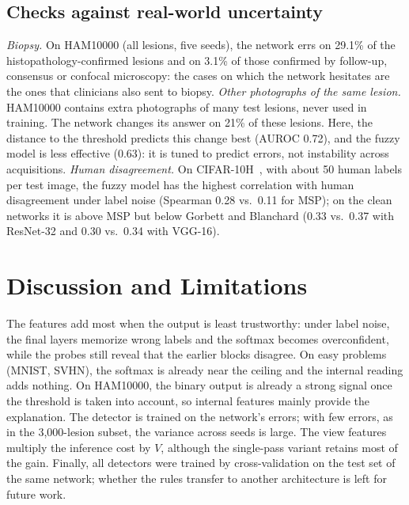 \subsection{Checks against real-world uncertainty}
\textit{Biopsy.} On HAM10000 (all lesions, five seeds), the network errs on 29.1\% of the histopathology-confirmed lesions and on 3.1\%
of those confirmed by follow-up, consensus or confocal microscopy: the cases on which the network hesitates are the ones that clinicians
also sent to biopsy.
\textit{Other photographs of the same lesion.} HAM10000 contains extra photographs of many test lesions, never used in training. The network
changes its answer on 21\% of these lesions. Here, the distance to the threshold predicts this change best (AUROC 0.72), and the fuzzy model
is less effective (0.63): it is tuned to predict errors, not instability across acquisitions.
\textit{Human disagreement.} On CIFAR-10H~\cite{peterson2019}, with about 50 human labels per test image, the fuzzy model has the highest
correlation with human disagreement under label noise (Spearman 0.28 vs.\ 0.11 for MSP); on the clean networks it is above MSP but below
Gorbett and Blanchard (0.33 vs.\ 0.37 with ResNet-32 and 0.30 vs.\ 0.34 with VGG-16).

\section{Discussion and Limitations}
The features add most when the output is least trustworthy: under label noise, the final layers memorize wrong labels and the softmax
becomes overconfident, while the probes still reveal that the earlier blocks disagree. On easy problems (MNIST, SVHN), the softmax is
already near the ceiling and the internal reading adds nothing. On HAM10000, the binary output is already a strong signal once the
threshold is taken into account, so internal features mainly provide the explanation.
The detector is trained on the network's errors; with few errors, as in the 3,000-lesion subset, the variance across seeds is large.
The view features multiply the inference cost by $V$, although the single-pass variant retains most of the gain.
Finally, all detectors were trained by cross-validation on the test set of the same network; whether the rules transfer to another
architecture is left for future work.

